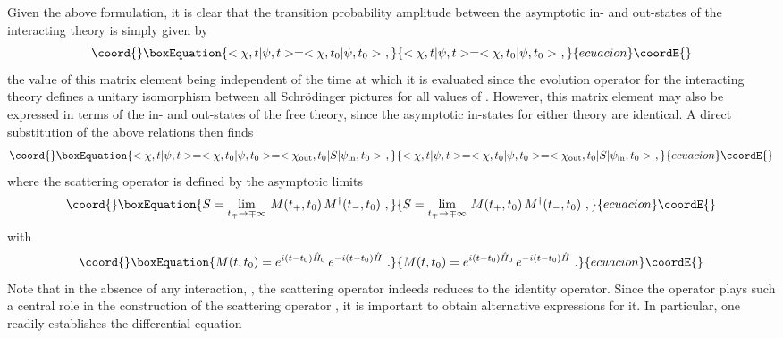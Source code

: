 \documentclass[a4paper,11pt]{article}
\begin{document}
Given the above formulation, it is clear that the transition probability
amplitude between the asymptotic in- and out-states of the interacting
theory is simply given by
\begin{equation}\coord{}\boxEquation{
<\chi,t|\psi,t>=<\chi,t_0|\psi,t_0>\ ,
}{
<\chi,t|\psi,t>=<\chi,t_0|\psi,t_0>\ ,
}{ecuacion}\coordE{}\end{equation}
the value of this matrix element being independent of the time \coordHE{} at which 
it is evaluated since the evolution operator \coordHE{} for the
interacting theory defines a unitary isomorphism between all Schr\"odinger 
pictures for all values of \coordHE{}. However, this matrix element may also be 
expressed in terms of the in- and out-states of the free theory, since the 
asymptotic in-states for either theory are identical. A direct substitution 
of the above relations then finds
\begin{equation}\coord{}\boxEquation{
<\chi,t|\psi,t>=<\chi,t_0|\psi,t_0>=<\chi_{\rm out},t_0|S|\psi_{\rm in},t_0>\ ,
\label{eq:Svalue}
}{
<\chi,t|\psi,t>=<\chi,t_0|\psi,t_0>=<\chi_{\rm out},t_0|S|\psi_{\rm in},t_0>\ ,
}{ecuacion}\coordE{}\end{equation}
where the scattering operator \coordHE{} is defined by the asymptotic limits
\begin{equation}\coord{}\boxEquation{
S=\lim_{t_\mp\rightarrow\mp\infty}\,M(t_+,t_0)\,M^\dagger(t_-,t_0)\ ,
}{
S=\lim_{t_\mp\rightarrow\mp\infty}\,M(t_+,t_0)\,M^\dagger(t_-,t_0)\ ,
}{ecuacion}\coordE{}\end{equation}
with
\begin{equation}\coord{}\boxEquation{
M(t,t_0)=e^{i(t-t_0)\hat{H}_0}\,e^{-i(t-t_0)\hat{H}}\ .
}{
M(t,t_0)=e^{i(t-t_0)\hat{H}_0}\,e^{-i(t-t_0)\hat{H}}\ .
}{ecuacion}\coordE{}\end{equation}
Note that in the absence of any interaction, \coordHE{},
the scattering operator \coordHE{} indeeds reduces to the identity operator.
Since the operator \coordHE{} plays such a central role in the construction
of the scattering operator \coordHE{}, it is important to obtain alternative
expressions for it. In particular, one readily establishes
the differential equation
\end{document}
